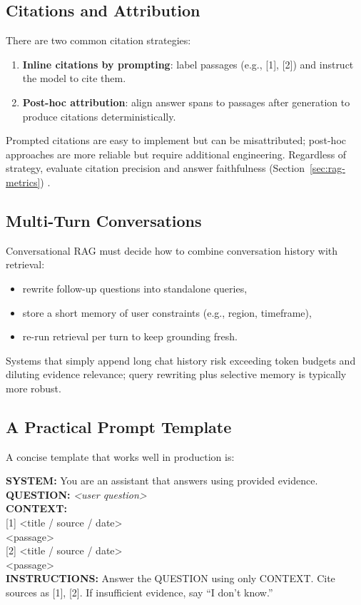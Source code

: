 \subsection{Citations and Attribution}
There are two common citation strategies:
\begin{enumerate}
    \item \textbf{Inline citations by prompting}: label passages (e.g., [1], [2]) and instruct the model to cite them.
    \item \textbf{Post-hoc attribution}: align answer spans to passages after generation to produce citations deterministically.
\end{enumerate}
Prompted citations are easy to implement but can be misattributed; post-hoc approaches are more reliable but require additional engineering. Regardless of strategy, evaluate citation precision and answer faithfulness (Section~\ref{sec:rag-metrics}) \cite{ragas_eacl2024}.

\subsection{Multi-Turn Conversations}
Conversational RAG must decide how to combine conversation history with retrieval:
\begin{itemize}
    \item rewrite follow-up questions into standalone queries,
    \item store a short memory of user constraints (e.g., region, timeframe),
    \item re-run retrieval per turn to keep grounding fresh.
\end{itemize}
Systems that simply append long chat history risk exceeding token budgets and diluting evidence relevance; query rewriting plus selective memory is typically more robust.

\subsection{A Practical Prompt Template}
A concise template that works well in production is:

\begin{tcolorbox}[
  title={\textbf{Practical Prompt Template for RAG}},
  colback=teal!5,
  colframe=teal!40!black,
  colbacktitle=teal!20,
  coltitle=black,
  fonttitle=\bfseries,
  boxrule=0.7pt,
  arc=4pt,
  left=5mm, right=5mm, top=4mm, bottom=4mm,
  before skip=12pt,
  after skip=12pt
]
\small
\ttfamily
\textbf{SYSTEM:} You are an assistant that answers using provided evidence.\\[2pt]
\textbf{QUESTION:} \emph{<user question>}\\[2pt]
\textbf{CONTEXT:}\\[2pt]
[1] <title / source / date>\\
<passage>\\[2pt]
[2] <title / source / date>\\
<passage>\\[2pt]
\textbf{INSTRUCTIONS:} Answer the QUESTION using only CONTEXT. Cite sources as [1], [2]. If insufficient evidence, say ``I don't know.''
\end{tcolorbox}

